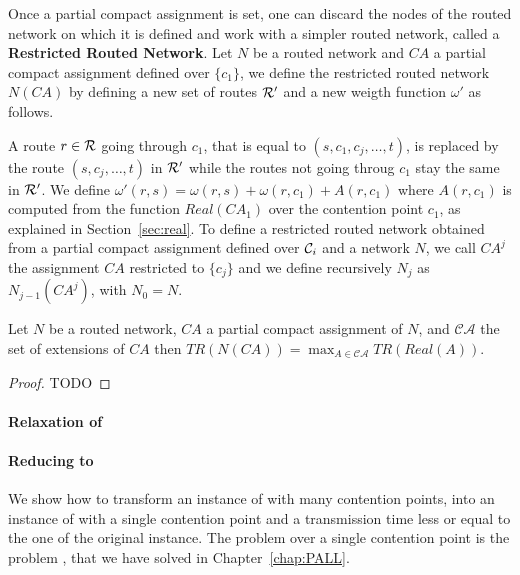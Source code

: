 Once a partial compact assignment is set, one can discard the nodes of the routed network on which it is defined
and work with a simpler routed network, called a \textbf{Restricted Routed Network}. Let $N$ be a routed network
and $CA$ a partial compact assignment defined over $\{c_1\}$, we define the restricted routed network $N(CA)$ by defining a new set of routes ${\cal R}'$ and a new weigth function $\omega'$ as follows. 

A route $r \in {\cal R}$ going through $c_1$, that is equal to $(s,c_1,c_j,\ldots,t)$,  is replaced by the route $(s,c_j,\ldots,t)$ in ${\cal R}'$ while the routes not going throug $c_1$ stay the same in ${\cal R}'$. We define $\omega'(r,s) = \omega(r,s)+\omega(r,c_1) + A(r,c_1)$ where $A(r,c_1)$ is computed from the function $Real(CA_1)$ over the contention point $c_1$, as explained in Section~\ref{sec:real}. To define a restricted routed network obtained from a partial compact assignment defined over ${\cal C}_i$ and a network $N$,  we call $CA^j$ the assignment $CA$ restricted to $\{c_j\}$ and 
we define recursively $N_j$ as $N_{j-1}(CA^{j})$, with $N_0 = N$.



\begin{lemma}
Let $N$ be a routed network, $CA$ a partial compact assignment of $N$, and $\mathcal{CA}$
the set of extensions of $CA$ then $TR(N(CA)) = \max_{ A \in \mathcal{CA}} TR(Real(A))$.
\end{lemma}
\begin{proof}
TODO
\end{proof}

\paragraph{Relaxation of \spall}



\paragraph{Reducing \spall to \wta}

We show how to transform an instance of \spall with many contention points, into an instance
of \spall with a single contention point and a transmission time less or equal to the one of the original instance.
The problem \spall over a single contention point is the problem \wta, that we have solved in Chapter~\ref{chap:PALL}.

